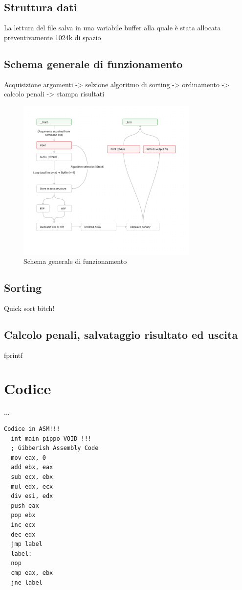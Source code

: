 \documentclass[a4paper]{report}
\begin{document}
\subsection{Struttura dati}
La lettura del file salva in una variabile buffer alla quale è stata allocata preventivamente 1024k di spazio

\subsection{Schema generale di funzionamento}


Acquisizione argomenti -> selzione algoritmo di sorting -> ordinamento -> calcolo penali -> stampa risultati

\begin{figure}[H]
  \centering
  \includegraphics[width=0.8\textwidth]{schema.png}
  \caption{Schema generale di funzionamento}
  \label{fig:schema}
\end{figure}

\subsection{Sorting}
Quick sort bitch!

\subsection{Calcolo penali, salvataggio risultato ed uscita}
fprintf


\section{Codice}

...  

\begin{lstlisting}[firstnumber=34]
  Codice in ASM!!!
  int main pippo VOID !!!
  ; Gibberish Assembly Code
  mov eax, 0
  add ebx, eax
  sub ecx, ebx
  mul edx, ecx
  div esi, edx
  push eax
  pop ebx
  inc ecx
  dec edx
  jmp label
  label:
  nop
  cmp eax, ebx
  jne label

\end{lstlisting}


\vspace{20pt}
\end{document}
